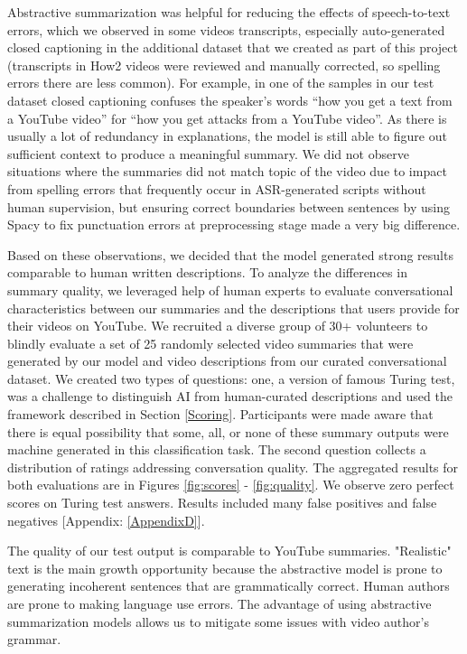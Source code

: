 \documentclass[sigconf]{acmart}
\begin{document}
Abstractive summarization was helpful for reducing the effects of speech-to-text errors, which we observed in some videos transcripts, especially auto-generated closed captioning in the additional dataset that we created as part of this project (transcripts in How2 videos were reviewed and manually corrected, so spelling errors there are less common).  For example, in one of the samples in our test dataset closed captioning confuses the speaker’s words “how you get a text from a YouTube video” for  “how you get attacks from a YouTube video”. As there is usually a lot of redundancy in explanations, the model is still able to figure out sufficient context to produce a meaningful summary. We did not observe situations where the summaries did not match topic of the video due to impact from spelling errors that frequently occur in ASR-generated scripts without human supervision, but ensuring correct boundaries between sentences by using Spacy to fix punctuation errors at preprocessing stage made a very big difference.

Based on these observations, we decided that the model generated strong results comparable to human written descriptions. To analyze the differences in summary quality, we leveraged help of human experts to evaluate conversational characteristics between our summaries and the descriptions that users provide for their videos on YouTube. We recruited a diverse group of 30+ volunteers to blindly evaluate a set of 25 randomly selected video summaries that were generated by our model and video descriptions from our curated conversational dataset. We created two types of questions: one, a version of famous Turing test, was a challenge to distinguish AI from human-curated descriptions and used the framework described in Section \ref{Scoring}. Participants were made aware that there is equal possibility that some, all, or none of these summary outputs were machine generated in this classification task. The second question collects a distribution of ratings addressing conversation quality. The aggregated results for both evaluations are in Figures \ref{fig:scores} - \ref{fig:quality}. We observe zero perfect scores on Turing test answers. Results included many false positives and false negatives [Appendix: \ref{AppendixD}]. 

The quality of our test output is comparable to YouTube summaries. "Realistic" text is the main growth opportunity because the abstractive model is prone to generating incoherent sentences that are grammatically correct. Human authors are prone to making language use errors. The advantage of using abstractive summarization models allows us to mitigate some issues with video author's grammar. 
\end{document}
